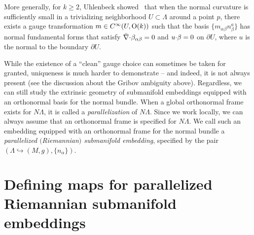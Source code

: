 \documentclass[pdftex]{sigma}
\numberwithin{equation}{section}
\renewcommand{\=}{\stackrel \Lambda =}
\newcommand{\csdot}{\hspace{-0.75mm} \cdot \hspace{-0.75mm}}
\begin{document}
More generally, for $k \geq 2$, Uhlenbeck showed~\cite{uhlenbeck1982} that when the normal curvature is sufficiently small in a trivializing neighborhood $U \subset \Lambda$ around a point $p$, there exists a gauge transformation $m \in C^\infty(U, {\rm O}(k))$ such that the basis $\big\{m_{\alpha \beta} n^a_{\beta}\big\}$ has normal fundamental forms that satisfy $\bar{\nabla} \csdot \beta_{\alpha \beta} = 0$ and $u \csdot \beta = 0$ on $\partial U$, where $u$ is the normal to the boundary $\partial U$.

While the existence of a ``clean'' gauge choice can sometimes be taken for granted, uniqueness is much harder to demonstrate -- and indeed, it is not always present (see the discussion about the Gribov ambiguity above). Regardless, we can still study the extrinsic geometry of submanifold embeddings equipped with an orthonormal basis for the normal bundle. When a global orthonormal frame exists for $N \Lambda$, it is called a \textit{parallelization} of $N \Lambda$. Since we work locally, we can always assume that an orthonormal frame is specified for $N \Lambda$. We call such an embedding equipped with an orthonormal frame for the normal bundle a \textit{parallelized $($Riemannian$)$ submanifold embedding}, specified by the pair $(\Lambda \hookrightarrow (M,g), \{n_{\alpha}\})$.

\section[Defining maps for parallelized Riemannian submanifold embeddings]{Defining maps for parallelized Riemannian submanifold\\ embeddings} \label{unit-def-funcs}
\end{document}
